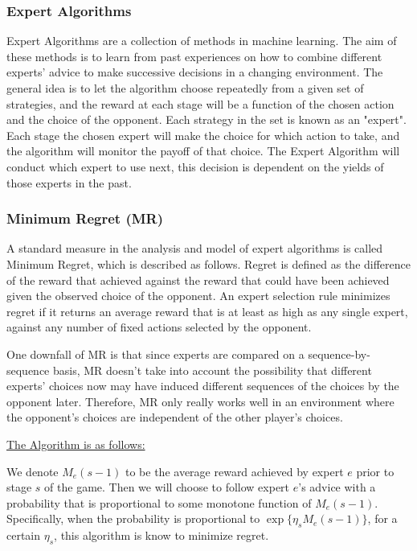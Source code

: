 \documentclass{icldt}
\numberwithin{equation}{section}       %
\begin{document}
\subsubsection{Expert Algorithms}
Expert Algorithms are a collection of methods in machine learning. The aim of these methods is to learn from past experiences on how to combine different experts' advice to make successive decisions in a changing environment. The general idea is to let the algorithm choose repeatedly from a given set of strategies, and the reward at each stage will be a function of the chosen action and the choice of the opponent. Each strategy in the set is known as an "expert". Each stage the chosen expert will make the choice for which action to take, and the algorithm will monitor the payoff of that choice. The Expert Algorithm will conduct which expert to use next, this decision is dependent on the yields of those experts in the past.

\subsubsection{Minimum Regret (MR)}
A standard measure in the analysis and model of expert algorithms is called Minimum Regret, which is described as follows. Regret is defined as the difference of the reward that achieved against the reward that could have been achieved given the observed choice of the opponent. An expert selection rule minimizes regret if it returns an average reward that is at least as high as any single expert, against any number of fixed actions selected by the opponent. \cite{experts}

One downfall of MR is that since experts are compared on a sequence-by-sequence basis, MR doesn't take into account the possibility that different experts' choices now may have induced different sequences of the choices by the opponent later. Therefore, MR only really works well in an environment where the opponent's choices are independent of the other player's choices.

\underline{The Algorithm is as follows:}

We denote \(M_e(s-1)\) to be the average reward achieved by expert \(e\) prior to stage \(s\) of the game. Then we will choose to follow expert \(e\)'s advice with a probability that is proportional to some monotone function of \(M_e(s-1)\). Specifically, when the probability is proportional to \(\exp\{\eta_sM_e(s-1)\}\), for a certain \(\eta_s\), this algorithm is know to minimize regret. \cite{mr1}\cite{mr2}
\end{document}
